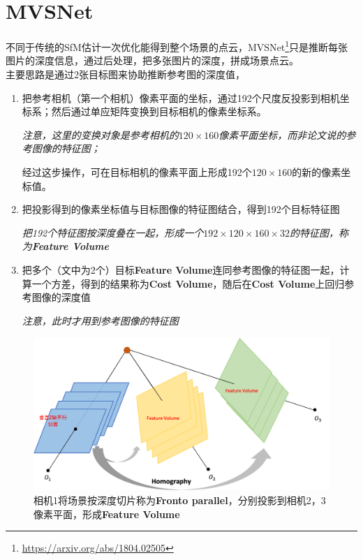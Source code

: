 \section{MVSNet}

	不同于传统的SfM估计一次优化能得到整个场景的点云，MVSNet\footnote{\url{https://arxiv.org/abs/1804.02505}}只是推断每张图片的深度信息，通过后处理，把多张图片的深度，拼成场景点云。\\

	主要思路是通过2张目标图来协助推断参考图的深度值，

	\begin{enumerate}
		\item 把参考相机（第一个相机）像素平面的坐标，通过192个尺度反投影到相机坐标系；然后通过单应矩阵变换到目标相机的像素坐标系。

		\small\textit{ 注意，这里的变换对象是参考相机的$120 \times 160$像素平面坐标，而非论文说的参考图像的特征图；}

		经过这步操作，可在目标相机的像素平面上形成192个$120 \times 160$的新的像素坐标值。

		\item 把投影得到的像素坐标值与目标图像的特征图结合，得到192个目标特征图

		\small\textit{把192个特征图按深度叠在一起，形成一个$192 \times 120 \times 160 \times 32$的特征图，称为\textbf{Feature Volume}}

		\item 把多个（文中为2个）目标\textbf{Feature Volume}连同参考图像的特征图一起，计算一个方差，得到的结果称为\textbf{Cost Volume}，随后在\textbf{Cost Volume}上回归参考图像的深度值

		\small\textit{注意，此时才用到参考图像的特征图}
	\end{enumerate}

	\begin{figure}[H]
		\begin{center}
			\includegraphics[width=\textwidth]{images/fronto.png}
		\end{center}
		\caption{相机1将场景按深度切片称为\textbf{Fronto parallel}，分别投影到相机2，3像素平面，形成\textbf{Feature Volume}}
	\end{figure}

